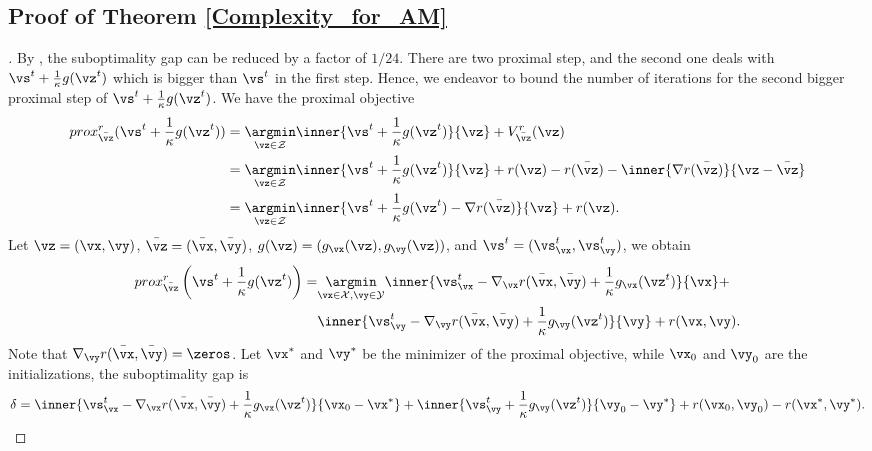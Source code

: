 \subsection{Proof of Theorem \ref{Complexity_for_AM}}
\begin{proof} [\unskip\nopunct]
    By \citep[Lemma 7, 8]{Jambulapati-2019-Direct}, the suboptimality gap can be reduced by a factor of $1/24$. There are two proximal step, and the second one deals with $\vs^t + \frac{1}{\kappa} g(\vz^t)$ which is bigger than $\vs^t$ in the first step. Hence, we endeavor to bound the number of iterations for the second bigger proximal step of $\vs^t + \frac{1}{\kappa} g(\vz^t)$. We have the proximal objective
    \begin{align*}
        prox^r_{\Bar{\vz}}(\vs^t + \frac{1}{\kappa} g(\vz^t)) &= \underset{\vz \in \mathcal{Z}} \argmin \inner{\vs^t + \frac{1}{\kappa} g(\vz^t)}{\vz} + V_{\Bar{\vz}}^r (\vz) \\
        &= \underset{\vz \in \mathcal{Z}} \argmin \inner{\vs^t + \frac{1}{\kappa} g(\vz^t)}{\vz} + r(\vz) - r(\Bar{\vz}) - \inner{\nabla r(\Bar{\vz})}{\vz - \Bar{\vz}} \\
        &= \underset{\vz \in \mathcal{Z}} \argmin \inner{\vs^t + \frac{1}{\kappa} g(\vz^t)-\nabla r(\Bar{\vz})}{\vz} + r(\vz).
    \end{align*}
    Let $\vz = (\vx,\vy)$, $\bar{\vz} = (\bar{\vx},\bar{\vy})$, $g(\vz) = (g_\vx(\vz),g_\vy(\vz))$, and $\vs^t = (\vs_\vx^t,\vs_\vy^t)$, we obtain
    \begin{align*}
        prox^r_{\Bar{\vz}}\left(\vs^t + \frac{1}{\kappa} g(\vz^t) \right) = &\underset{\vx \in \mathcal{X}, \vy \in \mathcal{Y}} \argmin \inner{\vs^t_\vx -\nabla_\vx r(\bar{\vx}, \bar{\vy}) + \frac{1}{\kappa} g_\vx(\vz^t)}{\vx} + \\
        &\inner{\vs^t_\vy -\nabla_\vy r(\bar{\vx}, \bar{\vy}) + \frac{1}{\kappa} g_\vy(\vz^t)}{\vy} + r(\vx,\vy).
    \end{align*}
    Note that $\nabla_\vy r(\bar{\vx}, \bar{\vy}) = \zeros$. Let $\vx^\ast$ and $\vy^\ast$ be the minimizer of the proximal objective, while $\vx_0$ and $\vy_0$ are the initializations, the suboptimality gap is 
    \begin{equation*}
        \delta = \inner{\vs^t_\vx -\nabla_\vx r(\bar{\vx}, \bar{\vy})+ \frac{1}{\kappa} g_\vx(\vz^t)}{\vx_0-\vx^\ast} + \inner{\vs^t_\vy + \frac{1}{\kappa} g_\vy(\vz^t)}{\vy_0-\vy^\ast} + r(\vx_0,\vy_0) - r(\vx^\ast,\vy^\ast).
    \end{equation*}

\end{proof}
